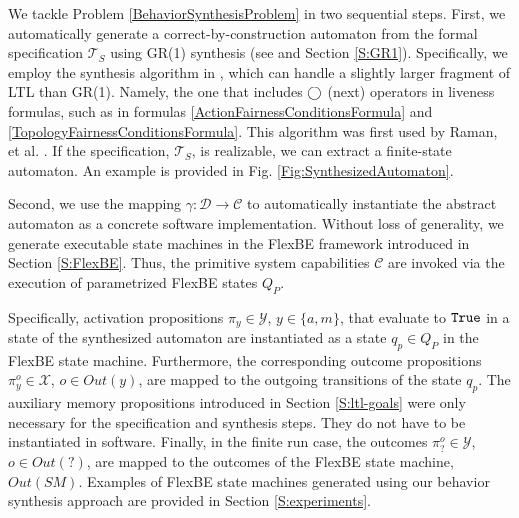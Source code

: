 

We tackle Problem \ref{BehaviorSynthesisProblem} in two sequential steps.
First, we automatically generate a correct-by-construction automaton from the formal specification $\mathcal{T}_S$ using GR(1) synthesis (see \cite{Bloem2012GR1} and Section \ref{S:GR1}).
Specifically, we employ the synthesis algorithm in \cite{SLUGS}, which can handle a slightly larger fragment of LTL than GR(1).
Namely, the one that includes $\operatorname{\bigcirc}$ (next) operators in liveness formulas, such as in formulas \eqref{ActionFairnessConditionsFormula} and \eqref{TopologyFairnessConditionsFormula}.
This algorithm was first used by Raman, et al. \cite{Vasu2013ICRA}.
If the specification, $\mathcal{T}_S$, is realizable, we can extract a finite-state automaton.
An example is provided in Fig. \ref{Fig:SynthesizedAutomaton}.

Second, we use the mapping $\gamma: \mathcal{D} \rightarrow \mathcal{C}$ to automatically instantiate the abstract automaton as a concrete software implementation.
Without loss of generality, we generate executable state machines in the FlexBE framework introduced in Section \ref{S:FlexBE}.
Thus, the primitive system capabilities $\mathcal{C}$ are invoked via the execution of parametrized FlexBE states $Q_P$.

Specifically, activation propositions $\pi_y \in \mathcal{Y}$, $y \in \{ a, m \}$, that evaluate to $\mathtt{True}$ in a state of the synthesized automaton are instantiated as a state $q_p \in Q_P$ in the FlexBE state machine.
Furthermore, the corresponding outcome propositions $\pi_y^o \in \mathcal{X}$, $o \in Out(y)$, are mapped to the outgoing transitions of the state $q_p$.
The auxiliary memory propositions introduced in Section \ref{S:ltl-goals} were only necessary for the specification and synthesis steps.
They do not have to be instantiated in software.
Finally, in the finite run case, the outcomes $\pi_?^o \in \mathcal{Y}$, $o \in Out(?)$, are mapped to the outcomes of the FlexBE state machine, $Out(SM)$.
Examples of FlexBE state machines generated using our behavior synthesis approach are provided in Section \ref{S:experiments}.

